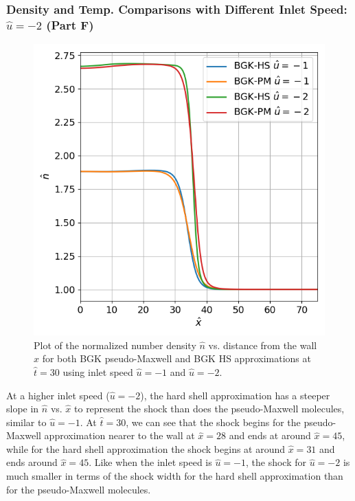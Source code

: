 \documentclass[a4paper]{article}
\begin{document}
\subsubsection{Density and Temp. Comparisons with Different Inlet Speed: $\hat{u} = -2$ (Part F)}
\begin{figure}[hbt!]
    \centering
    \includegraphics[width=14cm]{plots/problem_f_n.png}
    \caption{\centering Plot of the normalized number density $\hat{n}$ vs. distance from the wall $\hat{x}$ for both BGK pseudo-Maxwell and BGK HS approximations at $\hat{t} = 30$ using inlet speed $\hat{u} = -1$ and $\hat{u} = -2$.}
    \label{problem_f_n}
\end{figure}
At a higher inlet speed ($\hat{u} = -2$), the hard shell approximation has a steeper slope in $\hat{n}$ vs. $\hat{x}$ to represent the shock than does the pseudo-Maxwell molecules, similar to $\hat{u} = -1$. At $\hat{t} = 30$, we can see that the shock begins for the pseudo-Maxwell approximation nearer to the wall at $\hat{x} = 28$ and ends at around $\hat{x} = 45$, while for the hard shell approximation the shock begins at around $\hat{x} = 31$ and ends around $\hat{x} = 45$. Like when the inlet speed is $\hat{u} = -1$, the shock for  $\hat{u} = -2$ is much smaller in terms of the shock width for the hard shell approximation than for the pseudo-Maxwell molecules. 
\end{document}
